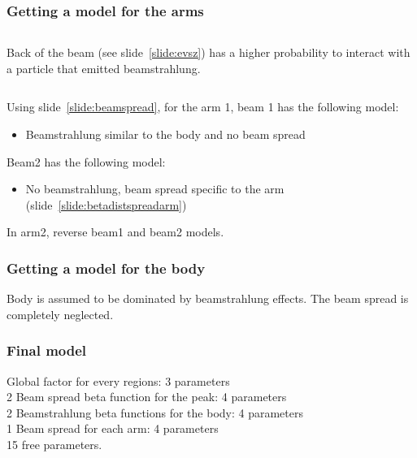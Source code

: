 \documentclass{beamer}
\begin{document}
\begin{frame}
\frametitle{Getting a model for the arms}
\begin{columns}[c]
\column{6cm}
\column{6cm}
Back of the beam (see slide~\ref{slide:evsz}) has a higher probability to interact
with a particle that emitted beamstrahlung.
\end{columns}
Using slide~\ref{slide:beamspread}, for the arm 1, beam 1 has the following
model:
\begin{itemize}
  \item Beamstrahlung similar to the body and no beam spread
\end{itemize}
Beam2 has the following model:
\begin{itemize}
  \item No beamstrahlung, beam spread specific to the arm (slide~\ref{slide:betadistspreadarm})
\end{itemize}
In arm2, reverse beam1 and beam2 models.
\end{frame}
\begin{frame}
\frametitle{Getting a model for the body}
Body is assumed to be dominated by beamstrahlung effects. The beam spread is
completely neglected.
\end{frame}

\begin{frame}
\frametitle{Final model}
Global factor for every regions: 3 parameters\\
2 Beam spread beta function for the peak: 4 parameters\\
2 Beamstrahlung beta functions for the body: 4 parameters\\
1 Beam spread for each arm: 4 parameters\\
\alert{15 free parameters}.
\end{frame}
\end{document}
